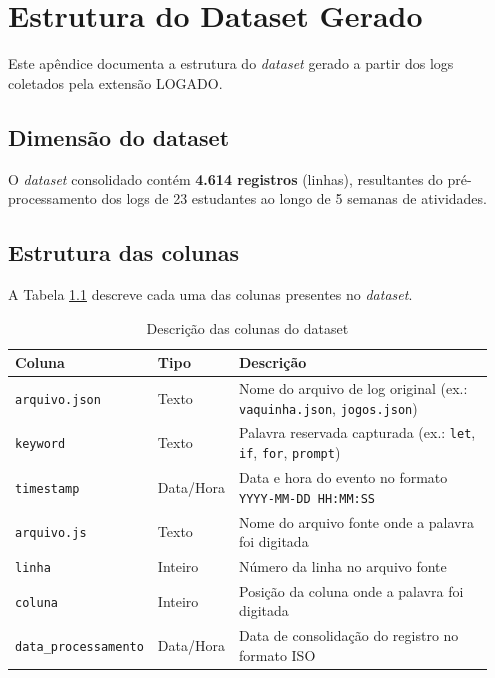 \chapter{Estrutura do Dataset Gerado}
\label{apendicec}

Este apêndice documenta a estrutura do \textit{dataset} gerado a partir dos logs coletados pela extensão LOGADO.

\section*{Dimensão do dataset}

O \textit{dataset} consolidado contém \textbf{4.614 registros} (linhas), resultantes do pré-processamento dos logs de 23 estudantes ao longo de 5 semanas de atividades.

\section*{Estrutura das colunas}

A Tabela \ref{tab:dataset-colunas} descreve cada uma das colunas presentes no \textit{dataset}.

\begin{table}[H]
\centering
\caption{Descrição das colunas do dataset}
\label{tab:dataset-colunas}
\begin{tabular}{|p{0.25\linewidth}|p{0.15\linewidth}|p{0.55\linewidth}|}
\hline
\textbf{Coluna} & \textbf{Tipo} & \textbf{Descrição} \\
\hline
\texttt{arquivo.json} & Texto & Nome do arquivo de log original (ex.: \texttt{vaquinha.json}, \texttt{jogos.json}) \\
\hline
\texttt{keyword} & Texto & Palavra reservada capturada (ex.: \texttt{let}, \texttt{if}, \texttt{for}, \texttt{prompt}) \\
\hline
\texttt{timestamp} & Data/Hora & Data e hora do evento no formato \texttt{YYYY-MM-DD HH:MM:SS} \\
\hline
\texttt{arquivo.js} & Texto & Nome do arquivo fonte onde a palavra foi digitada \\
\hline
\texttt{linha} & Inteiro & Número da linha no arquivo fonte \\
\hline
\texttt{coluna} & Inteiro & Posição da coluna onde a palavra foi digitada \\
\hline
\texttt{data\_processamento} & Data/Hora & Data de consolidação do registro no formato ISO \\
\hline
\end{tabular}
\end{table}

